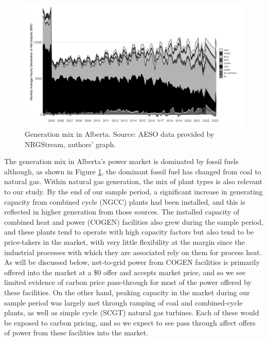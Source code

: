 \documentclass[12pt]{article}
\begin{document}
\begin{figure}[t]%
	\centering \vspace{-.25cm} \includegraphics[width=6.5in]{../images/gen_area_grey.png}
\vspace{-0.75cm}	\caption{Generation mix in Alberta.  Source: AESO data provided by NRGStream, authors' graph.}
\label{fig:gen_mix}
\end{figure}


The generation mix in Alberta's power market is dominated by fossil fuels although, as shown in Figure \ref{fig:gen_mix}, the dominant fossil fuel has changed from coal to natural gas. Within natural gas generation, the mix of plant types is also relevant to our study. By the end of our sample period, a significant increase in generating capacity from combined cycle (NGCC) plants had been installed, and this is reflected in higher generation from those sources. The installed capacity of combined heat and power (COGEN) facilities also grew during the sample period, and these plants tend to operate with high capacity factors but also tend to be price-takers in the market, with very little flexibility at the margin since the industrial processes with which they are associated rely on them for process heat. As will be discussed below, net-to-grid power from COGEN facilities is primarily offered into the market at a \$0 offer and accepts market price, and so we see limited evidence of carbon price pass-through for most of the power offered by these facilities. On the other hand, peaking capacity in the market during our sample period was largely met through ramping of coal and combined-cycle plants, as well as simple cycle (SCGT) natural gas turbines. Each of these would be exposed to carbon pricing, and so we expect to see pass through affect offers of power from these facilities into the market.
\end{document}
